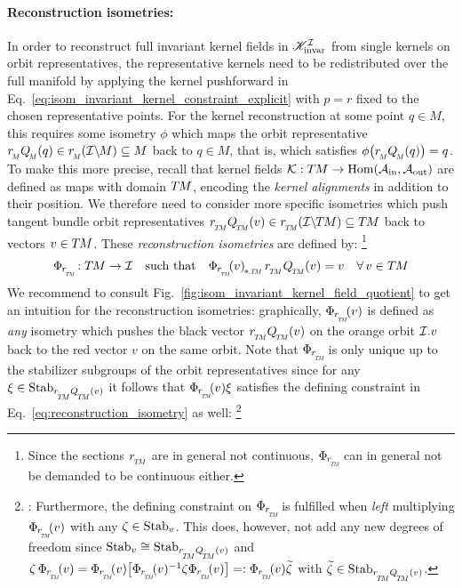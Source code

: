 \paragraph{Reconstruction isometries:}
In order to reconstruct full invariant kernel fields in $\mathscr{K}_\textup{invar}^{\mathcal{I}}$ from single kernels on orbit representatives, the representative kernels need to be redistributed over the full manifold by applying the kernel pushforward in Eq.~\eqref{eq:isom_invariant_kernel_constraint_explicit} with $p=r$ fixed to the chosen representative points.
For the kernel reconstruction at some point $q\in M$, this requires some isometry $\phi$ which maps the orbit representative $\rM\QM(q) \in \rM(\IM) \subseteq M$ back to $q\in M$, that is, which satisfies $\phi\big(\rM\QM(q)\big) = q$.
To make this more precise, recall that kernel fields $\mathcal{K}: T\mkern-1.5muM\to \operatorname{Hom}(\mathcal{A}_\textup{in},\mathcal{A}_\textup{out})$ are defined as maps with domain $T\mkern-1.5muM$, encoding the \emph{kernel alignments} in addition to their position.
We therefore need to consider more specific isometries which push tangent bundle orbit representatives $\rTM\QTM(v) \in \rTM(\ITM) \subseteq \TM$ back to vectors $v \in T\mkern-1.5muM$.
These \emph{reconstruction isometries} are defined by:%
\footnote{
    Since the sections $\rTM$ are in general not continuous, $\PhirNoArg$ can in general not be demanded to be continuous either.
}
\begin{align}\label{eq:reconstruction_isometry}
    \PhirNoArg: \TM \to \I \quad\textup{such that}\quad \dPhirTM{v}\, \rTM\mkern1mu \QTM(v) = v \quad \forall\, v\in \TM
\end{align}
We recommend to consult Fig.~\ref{fig:isom_invariant_kernel_field_quotient} to get an intuition for the reconstruction isometries:
graphically, $\Phir{v}$ is defined as \emph{any} isometry which pushes the black vector $\rTM\QTM(v)$ on the orange orbit $\mathcal{I}.v$ back to the red vector $v$ on the same orbit.
Note that $\PhirNoArg$ is only unique up to the stabilizer subgroups of the orbit representatives since for any $\xi\in \Stab{\rTM\QTM(v)}$ it follows that $\Phir{v} \xi$ satisfies the defining constraint in Eq.~\eqref{eq:reconstruction_isometry} as well:%
\footnote{\label{footnote:ambiguity_reconstruction_isometry}:%
    Furthermore, the defining constraint on $\PhirNoArg$ is fulfilled when \emph{left} multiplying $\Phir{v}$ with any $\zeta\in\operatorname{Stab}_{v}$.
    This does, however, not add any new degrees of freedom since $\Stab{v} \cong \Stab{\rTM\QTM(v)}$ and
    $\zeta\,\Phir{v} = \Phir{v} \big[\Phir{v}^{-1} \zeta \Phir{v}\big] =: \Phir{v} \widetilde{\zeta}$
    with $\widetilde{\zeta} \in \Stab{\rTM\QTM(v)}$.
}
